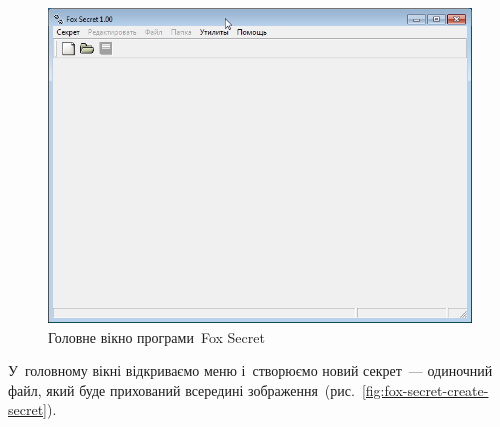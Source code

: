 \documentclass[
	a4paper,
	oneside,
	BCOR = 10mm,
	DIV = 12,
	12pt,
	headings = normal,
]{scrartcl}
\newlength{\gridunitwidth}
\begin{document}
		\begin{figure}[!htbp]
			\centering
			\includegraphics[width = 9\gridunitwidth]{./assets/p01.png}
			\caption{Головне вікно програми~\textenglish{Fox Secret}}
			\label{fig:fox-secret-main}
		\end{figure}

		У~головному вікні відкриваємо меню і~створюємо новий секрет~— одиночний файл, який буде прихований всередині зображення~(рис.~\ref{fig:fox-secret-create-secret}).
\end{document}
